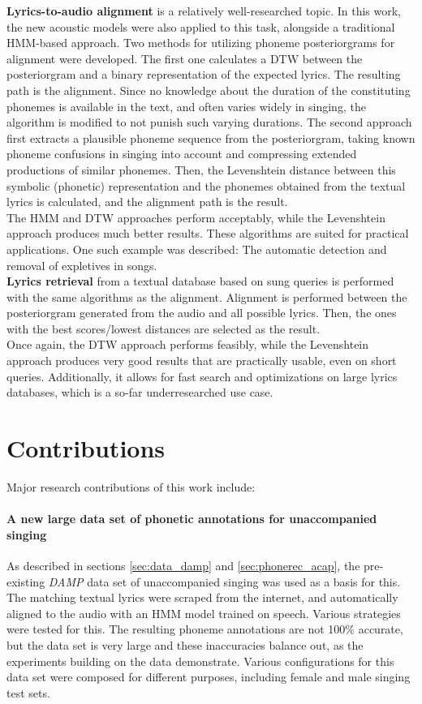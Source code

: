 \textbf{Lyrics-to-audio alignment} is a relatively well-researched topic. In this work, the new acoustic models were also applied to this task, alongside a traditional HMM-based approach. Two methods for utilizing phoneme posteriorgrams for alignment were developed. The first one calculates a DTW between the posteriorgram and a binary representation of the expected lyrics. The resulting path is the alignment. Since no knowledge about the duration of the constituting phonemes is available in the text, and often varies widely in singing, the algorithm is modified to not punish such varying durations. The second approach first extracts a plausible phoneme sequence from the posteriorgram, taking known phoneme confusions in singing into account and compressing extended productions of similar phonemes. Then, the Levenshtein distance between this symbolic (phonetic) representation and the phonemes obtained from the textual lyrics is calculated, and the alignment path is the result.\\
The HMM and DTW approaches perform acceptably, while the Levenshtein approach produces much better results. These algorithms are suited for practical applications. One such example was described: The automatic detection and removal of expletives in songs.\\

\textbf{Lyrics retrieval} from a textual database based on sung queries is performed with the same algorithms as the alignment. Alignment is performed between the posteriorgram generated from the audio and all possible lyrics. Then, the ones with the best scores/lowest distances are selected as the result.\\
Once again, the DTW approach performs feasibly, while the Levenshtein approach produces very good results that are practically usable, even on short queries. Additionally, it allows for fast search and optimizations on large lyrics databases, which is a so-far underresearched use case.

\section{Contributions}


Major research contributions of this work include:

\paragraph{A new large data set of phonetic annotations for unaccompanied singing}
As described in sections \ref{sec:data_damp} and \ref{sec:phonerec_acap}, the pre-existing \textit{DAMP} data set of unaccompanied singing was used as a basis for this. The matching textual lyrics were scraped from the internet, and automatically aligned to the audio with an HMM model trained on speech. Various strategies were tested for this. The resulting phoneme annotations are not 100\% accurate, but the data set is very large and these inaccuracies balance out, as the experiments building on the data demonstrate. Various configurations for this data set were composed for different purposes, including female and male singing test sets.

